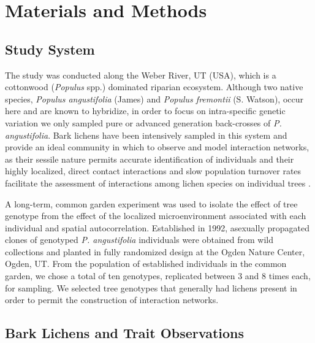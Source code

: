 \documentclass[fleqn,12pt]{olplainarticle}
\begin{document}
\section*{Materials and Methods}


\subsection*{Study System}

The study was conducted along the Weber River, UT (USA), which is a
cottonwood (\textit{Populus} spp.) dominated riparian
ecosystem. Although two native species, \textit{Populus angustifolia}
(James) and \textit{Populus fremontii} (S. Watson), occur here and are
known to hybridize, in order to focus on intra-specific genetic
variation we only sampled pure or advanced generation back-crosses of
\textit{P. angustifolia}. Bark lichens have been
intensively sampled in this system and provide an ideal community in
which to observe and model interaction networks, as their sessile
nature permits accurate identification of individuals and their highly
localized, direct contact interactions and slow population turnover
rates facilitate the assessment of interactions among lichen species
on individual trees \citep{Lamit2015a}.

A long-term, common garden experiment was used to isolate the effect
of tree genotype from the effect of the localized microenvironment
associated with each individual and spatial
autocorrelation. Established in 1992, asexually propagated clones of
genotyped \textit{P. angustifolia} individuals were obtained from wild
collections and planted in fully randomized design at the Ogden Nature
Center, Ogden, UT. From the population of established individuals in
the common garden, we chose a total of ten genotypes, replicated
between 3 and 8 times each, for sampling. We selected tree genotypes
that generally had lichens present in order to permit the construction
of interaction networks.



\subsection*{Bark Lichens and Trait Observations}
\end{document}
